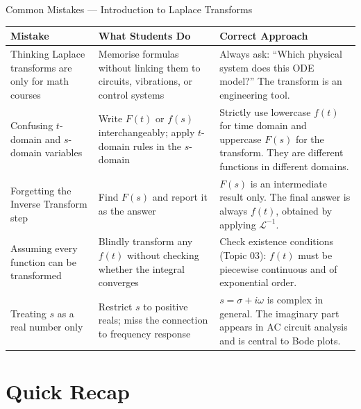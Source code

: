 \documentclass[12pt,a4paper]{article}
\begin{document}
\begin{mistakebox}{Common Mistakes --- Introduction to Laplace Transforms}
\begin{center}
\begin{tabular}{@{}p{4cm}p{4.5cm}p{5cm}@{}}
\toprule
\textbf{Mistake} & \textbf{What Students Do} & \textbf{Correct Approach} \\
\midrule
Thinking Laplace transforms are only for math courses &
  Memorise formulas without linking them to circuits, vibrations, or control
  systems &
  Always ask: ``Which physical system does this ODE model?''  The transform
  is an engineering tool. \\
\midrule
Confusing $t$-domain and $s$-domain variables &
  Write $F(t)$ or $f(s)$ interchangeably; apply $t$-domain rules in the
  $s$-domain &
  Strictly use lowercase $f(t)$ for time domain and uppercase $F(s)$ for the
  transform.  They are different functions in different domains. \\
\midrule
Forgetting the Inverse Transform step &
  Find $F(s)$ and report it as the answer &
  $F(s)$ is an intermediate result only.  The final answer is always $f(t)$,
  obtained by applying $\mathcal{L}^{-1}$. \\
\midrule
Assuming every function can be transformed &
  Blindly transform any $f(t)$ without checking whether the integral converges &
  Check existence conditions (Topic 03): $f(t)$ must be piecewise continuous
  and of exponential order. \\
\midrule
Treating $s$ as a real number only &
  Restrict $s$ to positive reals; miss the connection to frequency response &
  $s = \sigma + i\omega$ is complex in general.  The imaginary part appears
  in AC circuit analysis and is central to Bode plots. \\
\bottomrule
\end{tabular}
\end{center}
\end{mistakebox}

\section{Quick Recap}
\end{document}
